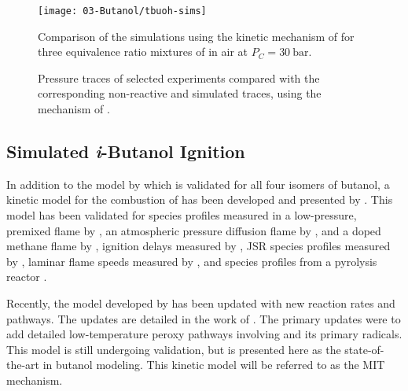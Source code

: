 \documentclass[../main.tex]{subfiles}
\begin{document}
\begin{figure}
\texttt{[image: 03-Butanol/tbuoh-sims]}
\caption{Comparison of the simulations using the kinetic mechanism of
\textcite{Sarathy2012} for three equivalence ratio mixtures of
\tBuOH{} in air at $P_C=\SI{30}{\bar}$.}
\label{fig:tbuoh-sims}
\end{figure}

\begin{figure}
    {\caption{Pressure traces of selected
     \tBuOH{} experiments compared with the corresponding
     non-reactive and simulated traces, using the mechanism of
     \textcite{Sarathy2012}.}
    }
\end{figure}

\subsection{Simulated \textit{i}-Butanol Ignition}
\label{sec:ibuoh-sims}

In addition to the model by \textcite{Sarathy2012} which is validated for
all four isomers of butanol, a kinetic model for the combustion of
\iBuOH{} has been developed and presented by \textcite{Hansen2013,
Merchant2013}. This model has been validated for species profiles
measured in a low-pressure, premixed flame by \textcite{Hansen2013},
an atmospheric pressure diffusion flame by \textcite{Grana2010}, and a
doped methane flame by \textcite{McEnally2005}, ignition delays measured
by \textcite{Stranic2012}, JSR species profiles measured by
\textcite{Togbe2010}, laminar flame speeds measured by
\textcite{Veloo2011a,Liu2011a}, and species profiles from a pyrolysis
reactor \textcite{Merchant2013}.

Recently, the \iBuOH{} model developed by \textcite{Hansen2013,
Merchant2013} has been updated with new reaction rates and pathways.
The updates are detailed in the work of \textcite{Weber2013a}. The
primary updates were to add detailed low-temperature peroxy pathways
involving \iBuOH{} and its primary radicals. This model is still undergoing
validation, but is presented here as the state-of-the-art in butanol
modeling. This kinetic model will be referred to as the MIT mechanism.
\end{document}
